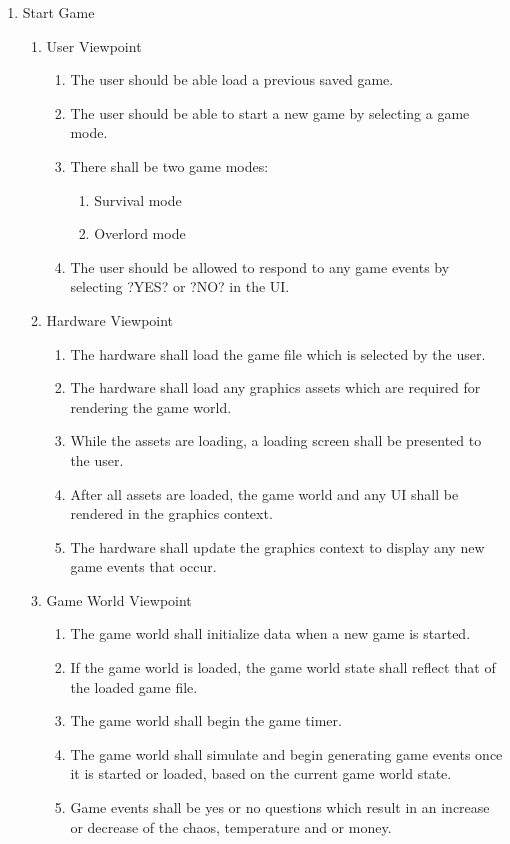 \documentclass[]{article}
\begin{document}
\begin{enumerate}[{BE}1.]
\begin{enumerate}[{VP4}.1]
		\end{enumerate}
		\item Start Game
	\begin{enumerate}[{VP5}.1]
		\item User Viewpoint
			\begin{enumerate}
				\item The user should be able load a previous saved game.
				\item The user should be able to start a new game by selecting a game mode.
				\item There shall be two game modes:
				\begin{enumerate}
					\item Survival mode
					\item Overlord mode
				\end{enumerate}
				\item The user should be allowed to respond to any game events by selecting ?YES? or ?NO? in the UI.
			\end{enumerate}
		\item Hardware Viewpoint
			\begin{enumerate}
				\item The hardware shall load the game file which is selected by the user.
				\item The hardware shall load any graphics assets which are required for rendering the game world.
				\item While the assets are loading, a loading screen shall be presented to the user.
				\item After all assets are loaded, the game world and any UI shall be rendered in the graphics context.
				\item The hardware shall update the graphics context to display any new game events that occur.
			\end{enumerate}
		\item Game World Viewpoint
			\begin{enumerate}
				\item The game world shall initialize data when a new game is started.
				\item If the game world is loaded, the game world state shall reflect that of the loaded game file.
				\item The game world shall begin the game timer.
				\item The game world shall simulate and begin generating game events once it is started or loaded, based on the current game world state.
				\item Game events shall be yes or no questions which result in an increase or decrease of the chaos, temperature and or money.

\end{enumerate}
\end{enumerate}
\end{enumerate}
\end{document}
